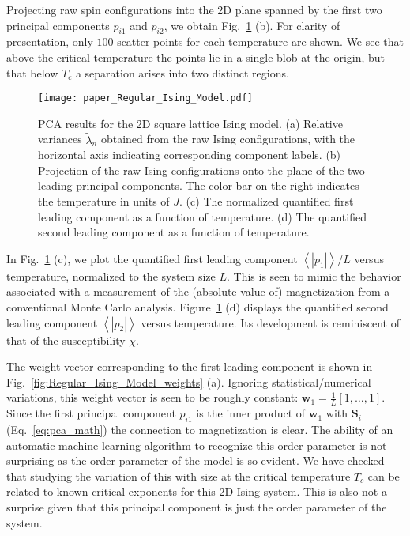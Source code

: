 \documentclass[pra,letterpaper,10pt,twocolumn]{revtex4}
\begin{document}
Projecting raw spin configurations into the 2D plane spanned by the
first two principal components $p_{i1}$ and $p_{i2}$, we obtain
Fig.~\ref{fig:Regular_Ising_Model} (b).  For clarity of presentation,
only $100$ scatter points for each temperature are shown.
We see that above the critical temperature
the points lie in a single blob at the origin, but that
below $T_c$ a separation arises into two distinct regions.

\begin{figure}[!h]
\texttt{[image: paper\_Regular\_Ising\_Model.pdf]}  
\caption{
PCA results for the 2D square lattice Ising model. (a) Relative variances
$\tilde{\lambda}_n$
obtained from the raw Ising configurations, with the horizontal axis indicating
corresponding component labels. (b) Projection of the raw Ising
configurations onto the plane of the two leading principal components.
The color bar on the right indicates the
temperature in units of $J$. (c) The normalized
quantified first leading component as a function of temperature. (d) The
quantified second leading component as a function of temperature. 
\label{fig:Regular_Ising_Model}
}
\end{figure}

In Fig.~\ref{fig:Regular_Ising_Model} (c), we plot the quantified first
leading component $\left\langle|p_{1}| \right\rangle/L$ versus
temperature, normalized to the system size $L$.  This is seen to mimic
the behavior associated with a measurement of the (absolute value of)
magnetization from a conventional Monte Carlo analysis.
Figure~\ref{fig:Regular_Ising_Model} (d) displays the quantified second
leading component $\left\langle|p_{2}| \right\rangle$ versus
temperature.  Its development is reminiscent of that of the
susceptibility $\chi$.

The weight vector corresponding to the first leading component is shown
in Fig.~\ref{fig:Regular_Ising_Model_weights} (a).  Ignoring
statistical/numerical variations, this weight vector is seen to be
roughly constant: $\mathbf{w}_1 = \frac{1}{L}[1,\dots,1]$.  Since the
first principal component $p_{i1}$ is the inner product of
$\mathbf{w}_1$ with $\mathbf{S}_i$ (Eq.~\ref{eq:pca_math}) the
connection to magnetization is clear.  The ability of an automatic
machine learning algorithm to recognize this order parameter is not
surprising as the order parameter of the model is so evident.  We have
checked that studying the variation of this with size at the critical
temperature $T_c$ can be related to known critical exponents for this 2D
Ising system. This is also not a surprise given that this principal
component is just the order parameter of the system.
\end{document}
